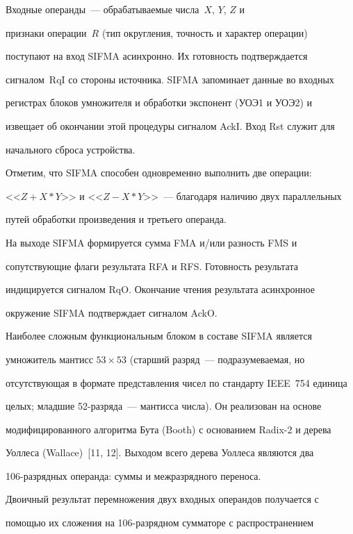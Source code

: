       Входные операнды~--- обрабатываемые числа~$X$, $Y$, $Z$ и

признаки операции~$R$ (тип округления, точность и характер операции)

поступают на вход SIFMA асинхронно. Их готовность подтверждается

сигналом~RqI со стороны источника. SIFMA запоминает данные во входных

регистрах блоков умножителя и обработки экспонент (УОЭ1 и УОЭ2) и

извещает об окончании этой процедуры сигналом AckI. Вход Rst служит для

начального сброса устройства.



      Отметим, что SIFMA способен одновременно выполнить две операции:\linebreak

<<$Z + X*Y$>> и <<$Z - X*Y$>>~--- благодаря наличию двух параллельных

путей обработки произведения и третьего операнда.





      На выходе SIFMA формируется сумма FMA и/или разность FMS и

сопутствующие флаги результата RFA и RFS. Готовность результата

индицируется сигналом RqO. Окончание чтения результата асинхронное

окружение SIFMA подтверждает сигналом AckO.



      Наиболее сложным функциональным блоком в составе SIFMA является

умножитель мантисс $53\times53$ (старший разряд~--- подразумеваемая, но

отсутствующая в формате представления чисел по стандарту IEEE~754 единица

целых; младшие 52-разряда~--- мантисса числа). Он реализован на основе

модифицированного алгоритма Бута (Booth) с основанием Radix-2 и дерева

Уоллеса (Wallace)~[11, 12]. Выходом всего дерева Уоллеса являются два

      106-раз\-ряд\-ных операнда: суммы и межразрядного переноса.

Двоичный результат перемножения двух входных операндов получается с

помощью их сложения на 106-раз\-ряд\-ном сумматоре с распространением

